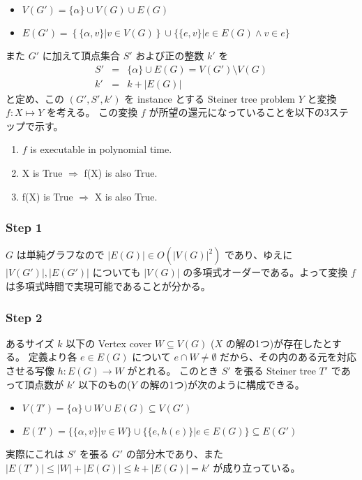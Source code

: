 \documentclass[12pt,uplatex,dvipdfmx,titlepage]{article}
\theoremstyle{case}
\begin{document}
    \begin{itemize}
        \item $V(G')=\{\alpha\}\cup V(G)\cup E(G)$
        \item $E(G')=\left\{\{\alpha, v\} | v\in V(G)\right\}\cup \{\{e,v\} | e\in E(G) \land v\in e \}$
    \end{itemize}
    また $G'$ に加えて頂点集合 $S'$ および正の整数 $k'$ を
    \begin{eqnarray*}
        S'&=&\{\alpha\}\cup E(G)=V(G')\setminus V(G)\\
        k'&=&k+|E(G)|
    \end{eqnarray*}
    と定め、この $(G',S',k')$ を instance とする Steiner tree problem $Y$ と変換 $f: X\mapsto Y$ を考える。
    この変換 $f$ が所望の還元になっていることを以下の3ステップで示す。

    \begin{enumerate}
        \item $f$ is executable in polynomial time.
        \item X is True $\Rightarrow$ f(X) is also True.
        \item f(X) is True $\Rightarrow$ X is also True. \\
    \end{enumerate}

    \subsubsection*{Step 1}
    $G$ は単純グラフなので $|E(G)|\in O(|V(G)|^2)$ であり、ゆえに $|V(G')|,|E(G')|$ についても $|V(G)|$ の多項式オーダーである。よって変換 $f$ は多項式時間で実現可能であることが分かる。

    \subsubsection*{Step 2}
    あるサイズ $k$ 以下の Vertex cover $W\subseteq V(G)$ ($X$ の解の1つ)が存在したとする。
    定義より各 $e\in E(G)$ について $e\cap W \neq \emptyset$ だから、その内のある元を対応させる写像 $h:E(G)\rightarrow W$ がとれる。
    このとき $S'$ を張る Steiner tree $T'$ であって頂点数が $k'$ 以下のもの($Y$ の解の1つ)が次のように構成できる。
    \begin{itemize}
        \item $V(T')=\{\alpha\}\cup W \cup E(G) \subseteq V(G')$
        \item $E(T')=\{\{\alpha,v\}|v\in W\}\cup \{\{e,h(e)\}|e\in E(G)\} \subseteq E(G')$
    \end{itemize}
    実際にこれは $S'$ を張る $G'$ の部分木であり、また $|E(T')|\le |W|+|E(G)|\le k+|E(G)|=k'$ が成り立っている。
\end{document}

